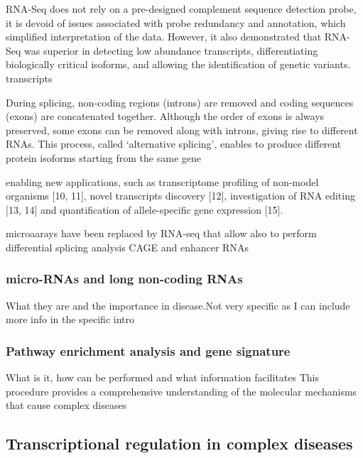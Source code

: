 RNA-Seq does not rely on a pre-designed complement sequence detection probe, it is devoid of issues associated with probe redundancy and annotation, which simplified interpretation of the data.
However, it also demonstrated that RNA-Seq was superior in detecting low abundance transcripts, differentiating biologically critical isoforms, and allowing the identification of genetic variants.
transcripts


 During splicing, non-coding regions (introns) are removed and coding sequences (exons) are concatenated together. Although the order of exons is always preserved, some exons can be removed along with introns, giving rise to different RNAs. This process, called ‘alternative splicing’, enables to produce different protein isoforms starting from the same gene


enabling new applications, such as transcriptome profiling of non-model organisms [10, 11], novel transcripts discovery [12], investigation of RNA editing [13, 14] and quantification of allele-specific gene expression [15].




microaarays have been replaced by RNA-seq that allow also to perform differential splicing analysis
CAGE and enhancer RNAs



\subsubsection{micro-RNAs and long non-coding RNAs}
What they are and the importance in disease.Not very specific as I can include more info in the specific intro

\subsubsection{Pathway enrichment analysis and gene signature}
What is it, how can be performed and what information facilitates
This procedure provides a comprehensive understanding of the molecular mechanisms that cause complex diseases


\subsection{Transcriptional regulation in complex diseases}


